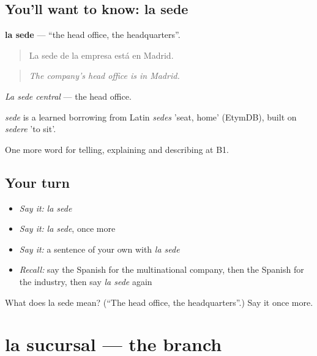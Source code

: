 \subsection*{You'll want to know: la sede}
\textbf{la sede} — \textquotedblleft{}the head office, the headquarters\textquotedblright{}.

\begin{quote}
La sede de la empresa está en Madrid.
\end{quote}

\begin{quote}
\emph{The company's head office is in Madrid.}
\end{quote}

\emph{La sede central} — the head office.

\begin{cousinweb}
\emph{sede} is a learned borrowing from Latin \emph{sedes} 'seat, home' (EtymDB), built on \emph{sedere} 'to sit'.
\end{cousinweb}

\begin{grammarlens}[title={What you've built}]
One more word for telling, explaining and describing at B1.
\end{grammarlens}

\subsection*{Your turn}
\begin{itemize}
\raggedright
  \item \emph{Say it:} \emph{la sede}
  \item \emph{Say it:} \emph{la sede}, once more
  \item \emph{Say it:} a sentence of your own with \emph{la sede}
  \item \emph{Recall:} say the Spanish for the multinational company, then the Spanish for the industry, then say \emph{la sede} again
\end{itemize}

\begin{tcolorbox}[breakable,colback=teal!4,colframe=teal!35!black,title={Before you move on}]
What does la sede mean? (\textquotedblleft{}The head office, the headquarters\textquotedblright{}.) Say it once more.
\end{tcolorbox}
\section[la sucursal]{la sucursal — the branch}

